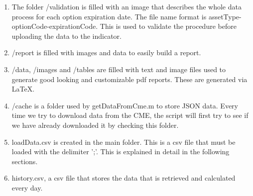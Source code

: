 \documentclass[10pt,a4paper]{book}
\begin{document}
\begin{enumerate}
  \item The folder /validation is filled with an image that describes the whole data process for each option expiration date. The file name format is assetType-optionCode-expirationCode. This is used to validate the procedure before uploading the data to the indicator.
  \item /report is filled with images and data to easily build a report.
  \item /data, /images and /tables are filled with text and image files used to generate good looking and customizable pdf reports. These are generated via LaTeX.
  \item /cache is a folder used by getDataFromCme.m to store JSON data. Every time we try to download data from the CME, the script will first try to see if we have already downloaded it by checking this folder.
  \item loadData.csv is created in the main folder. This is a csv file that must be loaded with the delimiter ';'. This is explained in detail in the following sections.
  \item history.csv, a csv file that stores the data that is retrieved and calculated every day.
\end{enumerate}

\raggedbottom
\pagebreak
\end{document}
